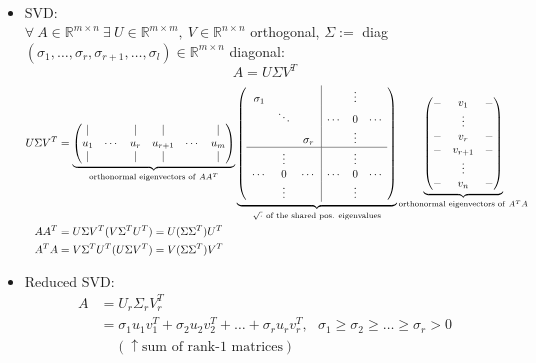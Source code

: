 \begin{frame}
	~\\
	{\blank
		\begin{itemize}\blank
			\item SVD:\\
			$\forall~A\in\mathbb{R}^{m\times n}~\exists~U\in\mathbb{R}^{m\times m},~V\in\mathbb{R}^{n\times n}$ orthogonal, $\Sigma:=$ diag$(\sigma_1,\dots,\sigma_r,\sigma_{r+1},\dots,\sigma_l)\in\mathbb{R}^{m\times n}$ diagonal:
			$$
			A=U\Sigma V^T
			$$
			\begin{align*}
			U\Sigma V^T&=\underbrace{\begin{pmatrix}
				|&&|&|&&|\\
				u_1&\cdots&u_r&u_{r+1}&\cdots&u_m\\
				|&&|&|&&|
				\end{pmatrix}}_{\text{orthonormal eigenvectors of}~AA^T}	
			\underbrace{\left(\begin{array}{ccc|ccc}
				\sigma_1&&&&\vdots&\\
				&\ddots&&\cdots&0&\cdots\\
				&&\sigma_r&&\vdots&\\\hline
				&\vdots&&&\vdots&\\
				\cdots&0&\cdots&\cdots&0&\cdots\\
				&\vdots&&&\vdots&
				\end{array}\right)}_{\sqrt{\cdot}~\text{of the shared pos. eigenvalues}}
			\underbrace{\begin{pmatrix}
				-&v_1&-\\
				~&\vdots&~\\
				-&v_r&-\\
				-&v_{r+1}&-\\
				~&\vdots&~\\
				-&v_n&-
				\end{pmatrix}}_{\text{orthonormal eigenvectors of}~A^TA}\\
			AA^T&=U\Sigma V^T(V\Sigma^TU^T)=U(\Sigma\Sigma^T)U^T\\
			A^TA&=V\Sigma^TU^T(U\Sigma V^T)=V(\Sigma\Sigma^T)V^T
			\end{align*}
			\item Reduced SVD:
			\begin{align*}
			A&=U_r\Sigma_rV_r^T\\
			&=\sigma_1u_1v_1^T+\sigma_2u_2v_2^T+\dots+\sigma_ru_rv_r^T,~~~\sigma_1\geq\sigma_2\geq\dots\geq\sigma_r>0\\
			&~~~~~(\uparrow\text{sum of rank-1 matrices})
			\end{align*}
		\end{itemize}
	}
\end{frame}
